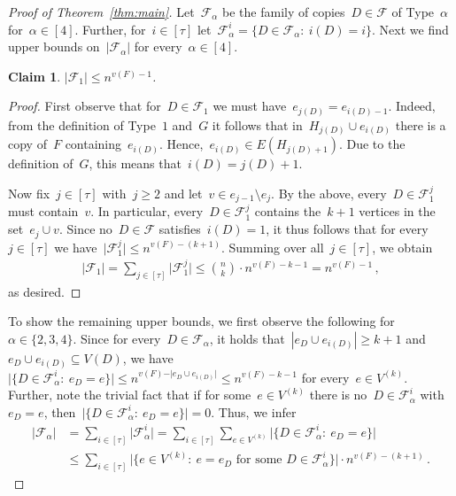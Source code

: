 \documentclass[10pt,a4paper]{amsart}
\newtheorem{claim}{Claim}
\newcommand{\cF}{\mathcal{F}}
\begin{document}
\begin{proof}[Proof of Theorem~\ref{thm:main}]
    Let~$\cF_{\alpha}$ be the family of copies~$D\in \cF$ of Type~$\alpha$ for~$\alpha\in[4]$.
    Further, for~$i\in[\tau]$ let~$\cF_{\alpha}^i=\{D\in\cF_{\alpha}:\:i(D)=i\}$.
    Next we find upper bounds on~$\vert\cF_{\alpha}\vert$ for every~$\alpha\in[4]$.

    \begin{claim}\label{cl:F1}
        $\vert \cF_1\vert\leq n^{v(F)-1}$.
    \end{claim}

    \begin{proof}
        First observe that for~$D \in \cF_1$ we must have~$e_{j(D)} = e_{i(D)-1}$.
        Indeed, from the definition of Type~$1$ and~$G$ it follows that in~$H_{j(D)}\cup e_{i(D)}$ there is a copy of~$F$ containing~$e_{i(D)}$.
        Hence,~$e_{i(D)}\in E(H_{j(D)+1})$.
        Due to the definition of~$G$, this means that~$i(D)=j(D)+1$.
        
        Now fix~$j\in[\tau]$ with~$j\geq2$ and let~$v \in e_{j-1} \setminus e_j$. 
        By the above, every~$D \in \mathcal{F}_1^j$ must contain~$v$. 
        In particular, every~$D\in\cF_1^j$ contains the~$k+1$ vertices in the set~$e_j\cup v$.
        Since no~$D\in\cF$ satisfies~$i(D)=1$, it thus follows that for every~$j\in[\tau]$ we have~$
        \vert\cF_1^j\vert\leq n^{v(F)-(k+1)}$. 
        Summing over all~$j\in[\tau]$, we obtain
        \begin{align*}
            \vert\mathcal{F}_1\vert=\sum_{j\in[\tau]} \vert\cF_1^j\vert\leq \binom{n}{k} \cdot n^{v(F)-k-1}= n^{v(F)-1}\,,
        \end{align*}
        as desired.
    \end{proof}
    
    To show the remaining upper bounds, we first observe the following for~$\alpha\in\{2,3,4\}$.
    Since for every~$D\in\cF_{\alpha}$, it holds that~$|e_D \cup e_{i(D)}|\geq k+1$ and~$e_D \cup e_{i(D)}\subseteq V(D)$, we have~$\vert\{D\in\cF_{\alpha}^i:\:e_D=e\}\vert\leq n^{v(F)-\vert e_D\cup e_{i(D)}\vert}\leq n^{v(F)-k-1}$ for every~$e\in V^{(k)}$.
    Further, note the trivial fact that if for some~$e\in V^{(k)}$ there is no~$D\in\cF_{\alpha}^i$ with~$e_D=e$, then~$\vert\{D\in\cF_{\alpha}^i:\:e_D=e\}\vert=0$.
    Thus, we infer
    \begin{align}\label{eq:generalupper}
        |\cF_{\alpha}|&=\sum_{i\in[\tau]}\vert\cF_{\alpha}^i\vert=\sum_{i \in [\tau]} \sum_{e\in V^{(k)}}\vert\{D\in\cF_{\alpha}^i:\:e_D=e\}\vert\nonumber\\
        &\leq\sum_{i \in [\tau]}\big\vert\{e\in V^{(k)}:\:e=e_D\text{ for some }D\in\cF_{\alpha}^i\}\big\vert \cdot n^{v(F) - (k+1)}\,.
    \end{align}


\end{proof}
\end{document}

